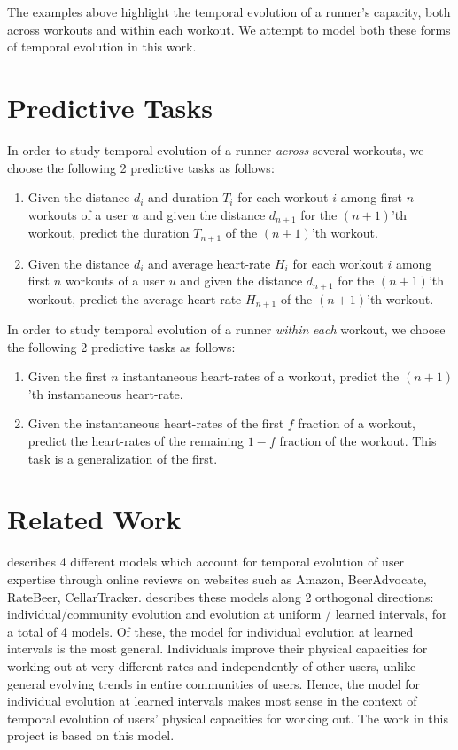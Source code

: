 \documentclass{acm_proc_article-sp}
\begin{document}
The examples above highlight the temporal evolution of a runner's capacity, both across workouts and within each workout. We attempt to model both these forms of temporal evolution in this work.

\section{Predictive Tasks}
\label{secPredictiveTasks}
In order to study temporal evolution of a runner \emph{across} several workouts, we choose the following 2 predictive tasks as follows:
\begin{enumerate}
\item Given the distance $d_i$ and duration $T_i$ for each workout $i$ among first $n$ workouts of a user $u$ and given the distance $d_{n+1}$ for the $(n+1)$'th workout, predict the duration $T_{n+1}$ of the $(n+1)$'th workout.
\item Given the distance $d_i$ and average heart-rate $H_i$ for each workout $i$ among first $n$ workouts of a user $u$ and given the distance $d_{n+1}$ for the $(n+1)$'th workout, predict the average heart-rate $H_{n+1}$ of the $(n+1)$'th workout.
\end{enumerate}

In order to study temporal evolution of a runner \emph{within} \emph{each} workout, we choose the following 2 predictive tasks as follows:

\begin{enumerate}
\item Given the first $n$ instantaneous heart-rates of a workout, predict the $(n+1)$'th instantaneous heart-rate.
\item Given the instantaneous heart-rates of the first $f$ fraction of a workout, predict the heart-rates of the remaining $1-f$ fraction of the workout. This task is a generalization of the first.
\end{enumerate}

\section{Related Work}
\cite{www13} describes 4 different models which account for temporal evolution of user expertise through online reviews on websites such as Amazon, BeerAdvocate, RateBeer, CellarTracker. \cite{www13} describes these models along 2 orthogonal directions: individual/community evolution and evolution at uniform / learned intervals, for a total of 4 models. Of these, the model for individual evolution at learned intervals is the most general. Individuals improve their physical capacities for working out at very different rates and independently of other users, unlike general evolving trends in entire communities of users. Hence, the model for individual evolution at learned intervals makes most sense in the context of temporal evolution of users' physical capacities for working out. The work in this project is based on this model.
\end{document}
